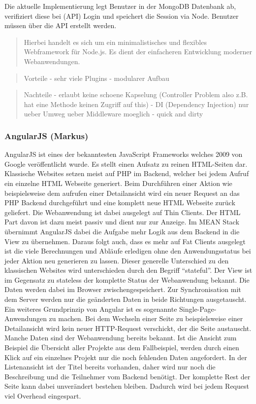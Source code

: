\documentclass[]{article}
\begin{document}
Die aktuelle Implementierung legt Benutzer in der MongoDB Datenbank ab,
verifiziert diese bei (API) Login und speichert die Session via Node.
Benutzer müssen über die API erstellt werden.

\begin{quote}
Hierbei handelt es sich um ein minimalistisches und flexibles
Webframework für Node.js. Es dient der einfacheren Entwicklung moderner
Webanwendungen.
\end{quote}

\begin{quote}
Vorteile - sehr viele Plugins - modularer Aufbau
\end{quote}

\begin{quote}
Nachteile - erlaubt keine schoene Kapselung (Controller Problem also
z.B. hat eine Methode keinen Zugriff auf this) - DI (Dependency
Injection) nur ueber Umweg ueber Middleware moeglich - quick and dirty
\end{quote}

\subsubsection{AngularJS (Markus)}\label{angularjs-markus}

AngularJS ist eines der bekanntesten JavaScript Frameworks welches 2009
von Google veröffentlicht wurde. Es stellt einen Aufsatz zu reinen
HTML-Seiten dar. Klassische Websites setzen meist auf PHP im Backend,
welcher bei jedem Aufruf ein einzelne HTML Webseite generiert. Beim
Durchführen einer Aktion wie beispielsweise dem aufrufen einer
Detailansicht wird ein neuer Request an das PHP Backend durchgeführt und
eine komplett neue HTML Webseite zurück geliefert. Die Webanwendung ist
dabei ausgelegt auf Thin Clients. Der HTML Part davon ist dazu meist
passiv und dient nur zur Anzeige. Im MEAN Stack übernimmt AngularJS
dabei die Aufgabe mehr Logik aus dem Backend in die View zu übernehmen.
Daraus folgt auch, dass es mehr auf Fat Clients ausgelegt ist die viele
Berechnungen und Abläufe erledigen ohne den Anwendungsstatus bei jeder
Aktion neu generieren zu lassen. Dieser generelle Unterschied zu den
klassischen Websites wird unterschieden durch den Begriff ``stateful''.
Der View ist im Gegensatz zu stateless der komplette Status der
Webanwendung bekannt. Die Daten werden dabei im Browser
zwischengespeichert. Zur Synchronisation mit dem Server werden nur die
geänderten Daten in beide Richtungen ausgetauscht. Ein weiteres
Grundprinzip von Angular ist es sogenannte Single-Page-Anwendungen zu
machen. Bei dem Wechseln einer Seite zu beispielsweise einer
Detailansicht wird kein neuer HTTP-Request verschickt, der die Seite
austauscht. Manche Daten sind der Webanwendung bereits bekannt. Ist die
Ansicht zum Beispiel die Übersicht aller Projekte aus dem Fallbeispiel,
werden durch einen Klick auf ein einzelnes Projekt nur die noch
fehlenden Daten angefordert. In der Listenansicht ist der Titel bereits
vorhanden, daher wird nur noch die Beschreibung und die Teilnehmer vom
Backend benötigt. Der komplette Rest der Seite kann dabei unverändert
bestehen bleiben. Dadurch wird bei jedem Request viel Overhead
eingespart.
\end{document}
